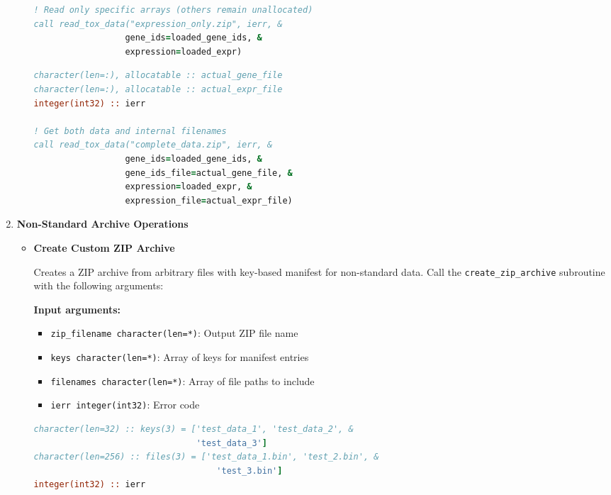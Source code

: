 \documentclass[11pt]{article}
\begin{document}
\begin{enumerate}
\begin{itemize}
	      	      \begin{lstlisting}[language=Fortran, caption={Read Partial Data Archive}]
! Read only specific arrays (others remain unallocated)
call read_tox_data("expression_only.zip", ierr, &
                  gene_ids=loaded_gene_ids, &
                  expression=loaded_expr)
	      	      \end{lstlisting}
	      	      
	      	      \begin{lstlisting}[language=Fortran, caption={Read with Filename Retrieval}]
character(len=:), allocatable :: actual_gene_file 
character(len=:), allocatable :: actual_expr_file
integer(int32) :: ierr

! Get both data and internal filenames
call read_tox_data("complete_data.zip", ierr, &
                  gene_ids=loaded_gene_ids, &
                  gene_ids_file=actual_gene_file, &
                  expression=loaded_expr, &
                  expression_file=actual_expr_file)
	      	      \end{lstlisting}
	      \end{itemize}
	      
	\item \textbf{Non-Standard Archive Operations}
	      \begin{itemize}
	      	\item \textbf{Create Custom ZIP Archive} \label{sec:custom_archive}
	      	      
	      	      Creates a ZIP archive from arbitrary files with key-based manifest for
	      	      non-standard data. Call the \texttt{create\_zip\_archive} subroutine with
	      	      the following arguments:
	      	      
	      	      \textbf{Input arguments:}
	      	      \begin{itemize}
	      	      	\item \texttt{zip\_filename character(len=*)}: Output ZIP file name
	      	      	      
	      	      	\item \texttt{keys character(len=*)}: Array of keys for manifest entries
	      	      	      
	      	      	\item \texttt{filenames character(len=*)}: Array of file paths to include
	      	      	      
	      	      	\item \texttt{ierr integer(int32)}: Error code
	      	      \end{itemize}
	      	      \begin{lstlisting}[language=Fortran, caption={Create Custom Archive}]
character(len=32) :: keys(3) = ['test_data_1', 'test_data_2', &
                                'test_data_3']
character(len=256) :: files(3) = ['test_data_1.bin', 'test_2.bin', &
                                    'test_3.bin']
integer(int32) :: ierr


\end{lstlisting}
\end{itemize}
\end{enumerate}
\end{document}

